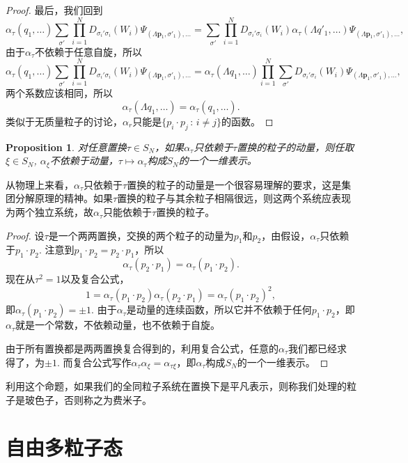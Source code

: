 \documentclass[11pt]{article}
\theoremstyle{definition}
\theoremstyle{plain}
\newtheorem{pro}[para]{Proposition}
\begin{document}
\begin{proof}
最后，我们回到
\[
	\alpha_\tau(q_1,\dots)\sum_{\sigma'}\prod_{i=1}^N D_{\sigma_i'\sigma_i}(W_i)\Psi_{(\Lambda \bm{p}_1,\sigma'_1),\dots}=\sum_{\sigma'}\prod_{i=1}^N D_{\sigma_i'\sigma_i}(W_i)\alpha_\tau(\Lambda q'_1,\dots)\Psi_{(\Lambda \bm{p}_{1},\sigma'_{1}),\dots},
\]
由于$\alpha_\tau$不依赖于任意自旋，所以
\[
	\alpha_\tau(q_1,\dots)\sum_{\sigma'}\prod_{i=1}^N D_{\sigma_i'\sigma_i}(W_i)\Psi_{(\Lambda \bm{p}_1,\sigma'_1),\dots}=\alpha_\tau(\Lambda q_1,\dots)\prod_{i=1}^N \sum_{\sigma'}D_{\sigma_i'\sigma_i}(W_i)\Psi_{(\Lambda \bm{p}_{1},\sigma'_{1}),\dots},
\]
两个系数应该相同，所以
\[
	\alpha_\tau(\Lambda q_1,\dots)=\alpha_\tau(q_1,\dots).
\]
类似于无质量粒子的讨论，$\alpha_r$只能是$\{p_i\cdot p_j\,:\, i\neq j\}$的函数。
\end{proof}

\begin{pro}
对任意置换$\tau\in S_N$，如果$\alpha_\tau$只依赖于$\tau$置换的粒子的动量，则任取$\xi\in S_N$, $\alpha_\xi$不依赖于动量，$\tau\mapsto\alpha_\tau$构成$S_N$的一个一维表示。
\end{pro}

从物理上来看，$\alpha_\tau$只依赖于$\tau$置换的粒子的动量是一个很容易理解的要求，这是集团分解原理的精神。如果$\tau$置换的粒子与其余粒子相隔很远，则这两个系统应表现为两个独立系统，故$\alpha_\tau$只能依赖于$\tau$置换的粒子。

\begin{proof}
设$\tau$是一个两两置换，交换的两个粒子的动量为$p_1$和$p_2$，由假设，$\alpha_{\tau}$只依赖于$p_1\cdot p_2$. 注意到$p_1\cdot p_2=p_2\cdot p_1$，所以
\[
	\alpha_{\tau}(p_2\cdot p_1)=\alpha_{\tau}(p_1\cdot p_2).
\]
现在从$\tau^2=1$以及复合公式，
\[
	1=\alpha_{\tau}(p_1\cdot p_2)\alpha_{\tau}(p_2\cdot p_1)=\alpha_{\tau}(p_1\cdot p_2)^2,
\]
即$\alpha_{\tau}(p_1\cdot p_2)=\pm 1$. 由于$\alpha_\tau$是动量的连续函数，所以它并不依赖于任何$p_1\cdot p_2$，即$\alpha_{\tau}$就是一个常数，不依赖动量，也不依赖于自旋。

由于所有置换都是两两置换复合得到的，利用复合公式，任意的$\alpha_\tau$我们都已经求得了，为$\pm 1$. 而复合公式写作$\alpha_\tau \alpha_\xi =\alpha_{\tau \xi}$，即$\alpha_\tau$构成$S_N$的一个一维表示。
\end{proof}

利用这个命题，如果我们的全同粒子系统在置换下是平凡表示，则称我们处理的粒子是玻色子，否则称之为费米子。

\section{自由多粒子态}
\end{document}
